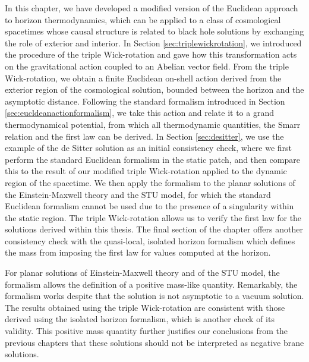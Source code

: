 In this chapter, we have developed a modified version of the Euclidean approach to horizon thermodynamics, which can be applied to a class of cosmological spacetimes whose causal structure is related to black hole solutions by exchanging the role of exterior and interior. In Section \ref{sec:triplewickrotation}, we introduced the procedure of the triple Wick-rotation and gave how this transformation acts on the gravitational action coupled to an Abelian vector field. From the triple Wick-rotation, we obtain a finite Euclidean on-shell action derived from the exterior region of the cosmological solution, bounded between the horizon and the asymptotic distance. Following the standard formalism introduced in Section \ref{sec:eucldeanactionformalism}, we take this action and relate it to a grand thermodynamical potential, from which all thermodynamic quantities, the Smarr relation and the first law can be derived. In Section \ref{sec:desitter}, we use the example of the de Sitter solution as an initial consistency check, where we first perform the standard Euclidean formalism in the static patch, and then compare this to the result of our modified triple Wick-rotation applied to the dynamic region of the spacetime. We then apply the formalism to the planar solutions of the Einstein-Maxwell theory and the STU model, for which the standard Euclidean formalism cannot be used due to the presence of a singularity within the static region. The triple Wick-rotation allows us to verify the first law for the solutions derived within this thesis. The final section of the chapter offers another consistency check with the quasi-local, isolated horizon formalism which defines the mass from imposing the first law for values computed at the horizon.

For planar solutions of Einstein-Maxwell theory and of the STU model, the formalism allows the definition of a positive mass-like quantity. Remarkably, the formalism works despite that the solution is not asymptotic to a vacuum solution. The results obtained using the triple Wick-rotation are consistent with those derived using the isolated horizon formalism, which is another check of its validity. This positive mass quantity further justifies our conclusions from the previous chapters that these solutions should not be interpreted as negative brane solutions.

